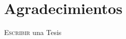 \pagestyle{empty}
\section*{Agradecimientos}
\lettrine[lraise=0.1, nindent=0em, slope=-.5em]{E}{scribir} una Tesis